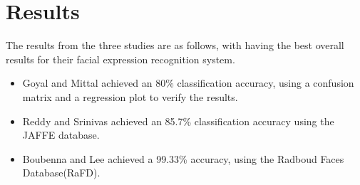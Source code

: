 \section{Results}
The results from the three studies are as follows, with \cite{3} having the best overall results for their facial expression recognition system.
\begin{itemize}
\item Goyal and Mittal achieved an 80\% classification accuracy, using a confusion matrix and a regression plot to verify the results\cite{1}.
\item Reddy and Srinivas achieved an 85.7\% classification accuracy using the JAFFE database\cite{2}.
\item Boubenna and Lee achieved a 99.33\% accuracy, using the Radboud Faces Database(RaFD)\cite{3}.
\end{itemize}


